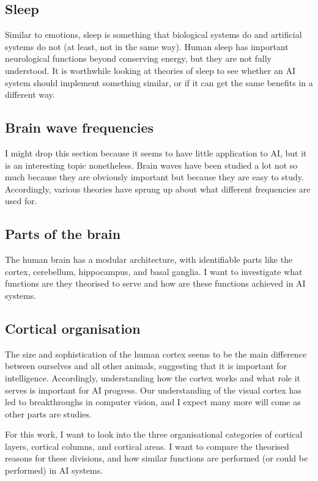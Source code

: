 \documentclass[10pt,a4paper]{article}
\begin{document}
\subsection{Sleep}
Similar to emotions, sleep is something that biological systems do and artificial systems do not (at least, not in the same way). Human sleep has important neurological functions beyond conserving energy, but they are not fully understood. It is worthwhile looking at theories of sleep to see whether an AI system should implement something similar, or if it can get the same benefits in a different way.

\subsection{Brain wave frequencies}
I might drop this section because it seems to have little application to AI, but it is an interesting topic nonetheless. Brain waves have been studied a lot not so much because they are obviously important but because they are easy to study. Accordingly, various theories have sprung up about what different frequencies are used for.

\subsection{Parts of the brain}
The human brain has a modular architecture, with identifiable parts like the cortex, cerebellum, hippocampus, and basal ganglia. I want to investigate what functions are they theorised to serve and how are these functions achieved in AI systems.

\subsection{Cortical organisation}
The size and sophistication of the human cortex seems to be the main difference between ourselves and all other animals, suggesting that it is important for intelligence. Accordingly, understanding how the cortex works and what role it serves is important for AI progress. Our understanding of the visual cortex has led to breakthroughs in computer vision, and I expect many more will come as other parts are studies.

For this work, I want to look into the three organisational categories of cortical layers, cortical columns, and cortical areas. I want to compare the theorised reasons for these divisions, and how similar functions are performed (or could be performed) in AI systems.
\end{document}
